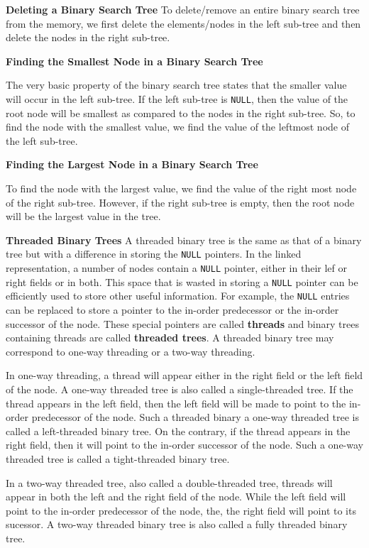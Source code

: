\filbreak
\vskip 1cm
{\bf Deleting a Binary Search Tree}
\vskip 1mm
To delete/remove an entire binary search tree from the memory, we first delete the elements/nodes in the left sub-tree and then delete the nodes in the right sub-tree.

\filbreak
\vskip 1cm
{\bf Finding the Smallest Node in a Binary Search Tree}

\vskip 1mm
The very basic property of the binary search tree states that the smaller value will occur in the left sub-tree. If the left sub-tree is {\tt NULL}, then the value of the root node will be smallest as compared to the nodes in the right sub-tree. So, to find the node with the smallest value, we find the value of the leftmost node of the left sub-tree.

\filbreak
\vskip 1cm
{\bf Finding the Largest Node in a Binary Search Tree}

\vskip 1mm
To find the node with the largest value, we find the value of the right most node of the right sub-tree. However, if the right sub-tree is empty, then the root node will be the largest value in the tree.

\filbreak
\vskip 1cm
{\bf Threaded Binary Trees}
\vskip 1mm
A threaded binary tree is the same as that of a binary tree but with a difference in storing the {\tt NULL} pointers. In the linked representation, a number of nodes contain a {\tt NULL} pointer, either in their lef or right fields or in both. This space that is wasted in storing a {\tt NULL} pointer can be efficiently used to store other useful information. For example, the {\tt NULL} entries can be replaced to store a pointer to the in-order predecessor or the in-order successor of the node. These special pointers are called {\bf threads} and binary  trees containing threads are called {\bf threaded trees}. A threaded binary tree may correspond to one-way threading or a two-way threading.

\vskip 1mm
In one-way threading, a thread will appear either in the right field or the left field of the node. A one-way threaded tree is also called a single-threaded tree. If the thread appears in the left field, then the left field will be made to point to the in-order predecessor of the node. Such a threaded binary a one-way threaded tree is called a left-threaded binary tree. On the contrary, if the thread appears in the right field, then it will point to the in-order successor of the node. Such a one-way threaded tree is called a tight-threaded binary tree.

\vskip 1mm
In a two-way threaded tree, also called a double-threaded tree, threads will appear in both the left and the right field of the node. While the left field will point to the in-order predecessor of the node, the, the right field will point to its sucessor. A two-way threaded binary tree is also called a fully threaded binary tree.


